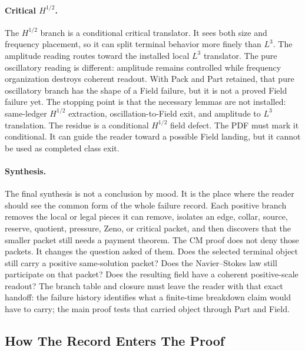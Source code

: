 \paragraph{Critical \(H^{1/2}\).}
The \(H^{1/2}\) branch is a conditional critical translator.
It sees both size and frequency placement, so it can split terminal behavior
more finely than \(L^3\).
The amplitude reading routes toward the installed local \(L^3\) translator.
The pure oscillatory reading is different: amplitude remains controlled while
frequency organization destroys coherent readout.
With Pack and Part retained, that pure oscillatory branch has the shape of a
Field failure, but it is not a proved Field failure yet.
The stopping point is that the necessary lemmas are not installed:
same-ledger \(H^{1/2}\) extraction, oscillation-to-Field exit, and amplitude to
\(L^3\) translation.
The residue is a conditional \(H^{1/2}\) field defect.
The PDF must mark it conditional.
It can guide the reader toward a possible Field landing, but it cannot be used
as completed class exit.

\paragraph{Synthesis.}
The final synthesis is not a conclusion by mood.
It is the place where the reader should see the common form of the whole
failure record.
Each positive branch removes the local or legal pieces it can remove, isolates
an edge, collar, source, reserve, quotient, pressure, Zeno, or critical packet,
and then discovers that the smaller packet still needs a payment theorem.
The CM proof does not deny those packets.
It changes the question asked of them.
Does the selected terminal object still carry a positive same-solution packet?
Does the Navier--Stokes law still participate on that packet?
Does the resulting field have a coherent positive-scale readout?
The branch table and closure must leave the reader with that exact handoff:
the failure history identifies what a finite-time breakdown claim would have to
carry; the main proof tests that carried object through Part and Field.

\subsection{How The Record Enters The Proof}

